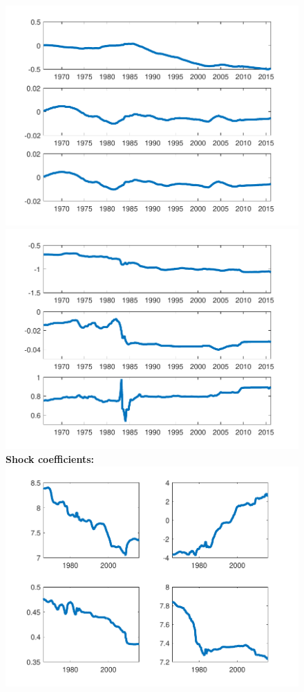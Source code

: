\documentclass[12pt,reqno]{article}
\numberwithin{equation}{section}
\begin{document}
\begin{figure}[H]
\includegraphics[scale=0.6]{NKPC_ree_init_MSV_alphas.pdf}
\includegraphics[scale=0.6]{NKPC_ree_init_MSV_betas.pdf}\\

\textbf{Shock coefficients:}\\

\includegraphics[scale=0.6]{NKPC_ree_init_MSV_shockCoef.pdf}\\


\end{figure}
\end{document}
